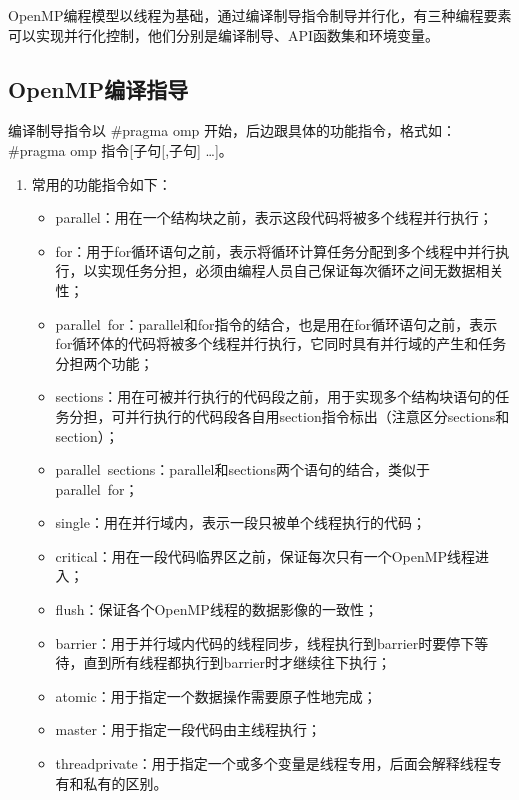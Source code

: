 \documentclass[UTF-8, a4paper, 12pt]{ctexart}
\begin{document}
OpenMP编程模型以线程为基础，通过编译制导指令制导并行化，有三种编程要素可以实现并行化控制，他们分别是编译制导、API函数集和环境变量。

\subsection{OpenMP编译指导}
编译制导指令以 \#pragma omp 开始，后边跟具体的功能指令，格式如：\#pragma omp 指令[子句[,子句] …]。
\begin{enumerate}
    \item 常用的功能指令如下：
\begin{itemize}
    \item parallel：用在一个结构块之前，表示这段代码将被多个线程并行执行；
    \item for：用于for循环语句之前，表示将循环计算任务分配到多个线程中并行执行，以实现任务分担，必须由编程人员自己保证每次循环之间无数据相关性；
    \item parallel for：parallel和for指令的结合，也是用在for循环语句之前，表示for循环体的代码将被多个线程并行执行，它同时具有并行域的产生和任务分担两个功能；
    \item sections：用在可被并行执行的代码段之前，用于实现多个结构块语句的任务分担，可并行执行的代码段各自用section指令标出（注意区分sections和section）；
    \item parallel sections：parallel和sections两个语句的结合，类似于parallel for；
    \item single：用在并行域内，表示一段只被单个线程执行的代码；
    \item critical：用在一段代码临界区之前，保证每次只有一个OpenMP线程进入；
    \item flush：保证各个OpenMP线程的数据影像的一致性；
   \item  barrier：用于并行域内代码的线程同步，线程执行到barrier时要停下等待，直到所有线程都执行到barrier时才继续往下执行；
    \item atomic：用于指定一个数据操作需要原子性地完成；
    \item master：用于指定一段代码由主线程执行；
    \item threadprivate：用于指定一个或多个变量是线程专用，后面会解释线程专有和私有的区别。
\end{itemize}


\end{enumerate}
\end{document}
